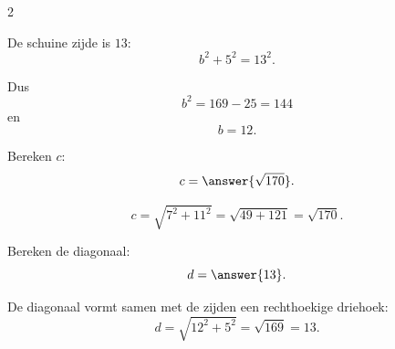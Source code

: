 \documentclass{ximera}
\begin{document}
\begin{oefening}[Pythagoras]{\oefB\ESS}
\begin{multicols}{2}
\begin{question}
    \begin{oplossing}
    De schuine zijde is $13$:
    \[
    b^2+5^2=13^2.
    \]
    
    Dus
    \[
    b^2=169-25=144
    \]
    en
    \[
    b=12.
    \]
    \end{oplossing}
    \end{question}
    
    
    \begin{question}
    
    \begin{center}
    \end{center}
    
    Bereken $c$:
    \[
    c=\answer{\sqrt{170}}.
    \]
    
    \begin{oplossing}
    \[
    c=\sqrt{7^2+11^2}
    =\sqrt{49+121}
    =\sqrt{170}.
    \]
    \end{oplossing}
    \end{question}
    
    
    \begin{question}
    
    \begin{center}
    \end{center}
    
    Bereken de diagonaal:
    \[
    d=\answer{13}.
    \]
    
    \begin{oplossing}
    De diagonaal vormt samen met de zijden een rechthoekige driehoek:
    \[
    d=\sqrt{12^2+5^2}
    =\sqrt{169}
    =13.
    \]
    \end{oplossing}
    \end{question}
    
    \end{multicols}
    
    \end{oefening}
    
\end{document}

